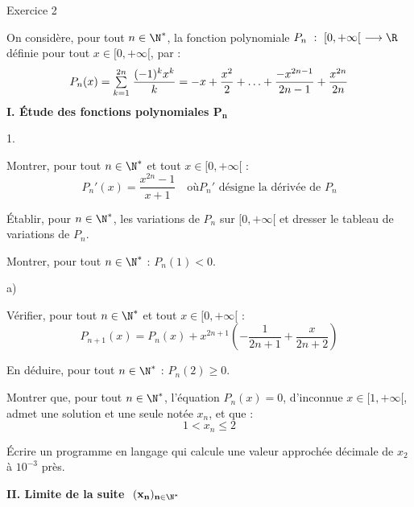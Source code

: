 \documentclass[11pt]{article}%
\begin{document}
\begin{center}
{\LARGE Exercice 2}
\end{center}

\noindent On considère, pour tout $n \in \N^*$, la
fonction polynomiale $P_{n} \ : \ [0, + \infty[ \ \longrightarrow \R$
définie pour tout $x \in [0, + \infty[$, par : 
\[
P_{n}(x) = {\textstyle\sum\limits_{k = 1}^{2n}}\hspace{.1cm}{\frac{(-1)^{k} x^{k} }{k}} = -x +
{\frac{x^{2}}{2}} + \ldots + {\frac{-x^{2n-1} }{2n- 1}} +
{\frac{x^{2n}}{2n}} 
\]
\textbf{I. Étude des fonctions polynomiales $\mathbf{P_{n}}$}

\begin{noliste}{1.}
 \setlength{\itemsep}{4mm}
\item Montrer, pour tout $n\in \N^{\ast }$ et tout $x\in \lbrack
0, + \infty \lbrack $ : 
\[
P_{n}{\prime }(x) = {\frac{x^{2n}-1}{x + 1}}\quad \text{où
}P_{n}{\prime }\text{ désigne la dérivée de }P_{n}
\]

\item Établir, pour $n\in \N^{\ast }$, les variations de $P_{n}$
sur $[0, + \infty \lbrack $ et dresser le tableau de variations de
$P_{n}$.

\item Montrer, pour tout $n\in \N^{\ast }$ : $P_{n}(1)<0$.

\item 
\begin{noliste}{a)}
 \setlength{\itemsep}{2mm}
\item Vérifier, pour tout $n\in \N^{\ast }$ et tout $x\in
\lbrack 0, + \infty \lbrack $ : 
\[
P_{n + 1}(x) = P_{n}(x) + x^{2n + 1}\left( -{\frac{1}{2n + 1}} +
{\frac{x}{2n + 2}}\right) 
\]

\item En déduire, pour tout $n\in \N^{\ast }$ : $P_{n}(2)\geq 0$.
\end{noliste}

\item Montrer que, pour tout $n\in \N^{\ast }$, l'équation $P_{n}(x) =
0$, d'inconnue $x\in \lbrack 1, + \infty \lbrack $, admet une
solution et une seule notée $x_{n}$, et que : 
\[
1<x_{n}\leq 2
\]

\item Écrire un programme en langage \Scilab{} qui calcule une valeur
approchée décimale de $x_{2}$ à $10^{-3}$ près.
\end{noliste}

\textbf{II. Limite de la suite $\mathbf{\ (x_{n})_{n \in \N^*}}$}
\end{document}
